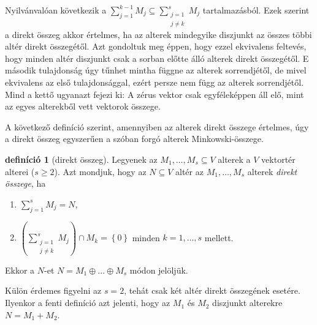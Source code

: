 \documentclass[9pt, a4paper, showtrims]{memoir}
\makeatletter
\renewenvironment{proof}[1][\proofname]
    {\par\pushQED{\qed}%
    \normalfont \topsep6\p@\@plus6\p@\relax
    \trivlist
    \item[\hskip\labelsep
        \itshape
    #1\@addpunct{:}]\ignorespaces}
    {\popQED\endtrivlist\@endpefalse}
\theoremstyle{plain}
\theoremstyle{remark}
\theoremstyle{definition}
\newtheorem{definition}[proposition]{definíció}
\makeatother
\begin{document}
\begin{proof}[Végül a $3.\Rightarrow 1.$]
    Nyilvánvalóan következik a
    $\sum_{j=1}^{k-1}M_j
    \subseteq
    \sum_{\substack{j=1\\j\neq k}}^sM_j
    $
    tartalmazásból.
\end{proof}
Ezek szerint a direkt összeg akkor értelmes, ha az alterek mindegyike diszjunkt az összes többi altér direkt összegétől.
Azt gondoltuk meg éppen, hogy ezzel ekvivalens feltevés, 
hogy minden altér diszjunkt csak a sorban előtte álló alterek direkt összegétől.
E második tulajdonság úgy tűnhet mintha függne az alterek sorrendjétől, 
de mivel ekvivalens az első tulajdonsággal,
ezért persze nem függ az alterek sorrendjétől.
Mind a kettő ugyanazt fejezi ki: A zérus vektor csak egyféleképpen áll elő, mint az egyes alterekből vett vektorok összege.

A következő definíció szerint, amennyiben az alterek direkt összege értelmes, úgy a direkt összeg egyszerűen a szóban forgó alterek Minkowski-összege.
\begin{definition}[direkt összeg]
	Legyenek az $M_1,\ldots,M_s\subseteq V$ alterek a $V$ vektortér alterei ($s\geq 2$).
	Azt mondjuk, hogy az $N\subseteq V$ altér az $M_1,\ldots,M_s$ alterek \emph{direkt összege},
	ha
	\begin{enumerate}
		\item $\sum_{j=1}^sM_j=N$,
		\item $\left( \sum_{\substack{j=1\\j\neq k}}^sM_j \right)\cap M_k
			      =
			      \left\{ 0 \right\}$
		      minden $k=1,\ldots,s$ mellett.
	\end{enumerate}
	Ekkor a $N$-et $N=M_1\oplus\dots\oplus M_s$ módon jelöljük.
\end{definition}
Külön érdemes figyelni az $s=2$, tehát csak két altér direkt összegének esetére.
Ilyenkor a fenti definíció azt jelenti,
hogy az $M_1$ és $M_2$ diszjunkt alterekre $N=M_1+M_2$.
\end{document}
